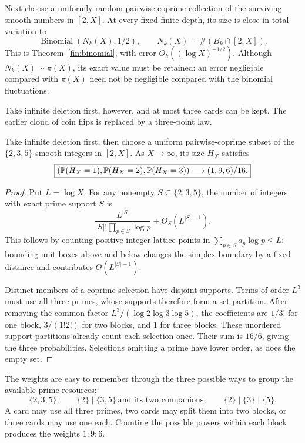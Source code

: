 Next choose a uniformly random pairwise-coprime collection of the
surviving smooth numbers in $[2,X]$.
At every fixed finite depth, its size is close in total variation to
\[
 \operatorname{Binomial}(N_k(X),1/2),\qquad
 N_k(X)=\#(B_k\cap[2,X]).
\]
This is Theorem~\ref{fin:binomial}, with error
$O_k((\log X)^{-1/2})$.
Although $N_k(X)\sim\pi(X)$, its exact value must be retained:
an error negligible compared with $\pi(X)$ need not be negligible
compared with the binomial fluctuations.

Take infinite deletion first, however, and at most three cards can be
kept.  The earlier cloud of coin flips is replaced by a three-point law.
\begin{proposition}\label{fin:endpoint}
Take infinite deletion first, then choose a uniform pairwise-coprime
subset of the $\{2,3,5\}$-smooth integers in $[2,X]$.
As $X\to\infty$, its size $H_X$ satisfies
\[
 \boxed{(\mathbb P(H_X=1),\mathbb P(H_X=2),\mathbb P(H_X=3))
                 \longrightarrow (1,9,6)/16.}
\]
\end{proposition}
\begin{proof}
Put $L=\log X$.  For any nonempty $S\subseteq\{2,3,5\}$, the number
of integers with exact prime support $S$ is
\[
 \frac{L^{|S|}}{|S|!\prod_{p\in S}\log p}+O_S(L^{|S|-1}).
\]
This follows by counting positive integer lattice points in
$\sum_{p\in S}a_p\log p\le L$: bounding unit boxes above and below
changes the simplex boundary by a fixed distance and contributes
$O(L^{|S|-1})$.

Distinct members of a coprime selection have disjoint supports.
Terms of order $L^3$ must use all three primes, whose supports
therefore form a set partition.  After removing the common factor
$L^3/(\log2\log3\log5)$, the coefficients are
$1/3!$ for one block, $3/(1!2!)$ for two blocks, and $1$ for three
blocks.  These unordered support partitions already count each
selection once.  Their sum is $16/6$, giving the three probabilities.
Selections omitting a prime have lower order, as does the empty set.
\end{proof}

The weights are easy to remember through the three possible ways to
group the available prime resources:
\[
 \{2,3,5\};\qquad
 \{2\}\mid\{3,5\}\ \text{and its two companions};\qquad
 \{2\}\mid\{3\}\mid\{5\}.
\]
A card may use all three primes, two cards may split them into two
blocks, or three cards may use one each.
Counting the possible powers within each block produces
the weights $1:9:6$.


